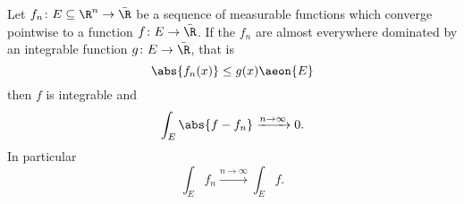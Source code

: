 \documentclass[12pt,oneside]{book}
\begin{document}
\begin{theorem} \label{theo:dominated convergence}
	Let \( f_n \colon E \subseteq \R^n \to \bar{\R} \) be a sequence of measurable functions which
	converge pointwise to a function \( f \colon E \to \bar{\R} \). If
	the \( f_n \) are almost everywhere dominated by an integrable function \( g \colon E
	\to \bar{\R} \), that is
	\begin{equation*}
		\abs{f_n(x)} \leq g(x) \aeon{E}
	\end{equation*}
	then \( f \) is integrable and
	\begin{equation*}
		\int_E \abs{f - f_n} \xrightarrow{n \to \infty} 0.
	\end{equation*}
	In particular
	\begin{equation*}
		\int_E f_n \xrightarrow{n \to \infty} \int_E f.
	\end{equation*}
\end{theorem}
\end{document}
